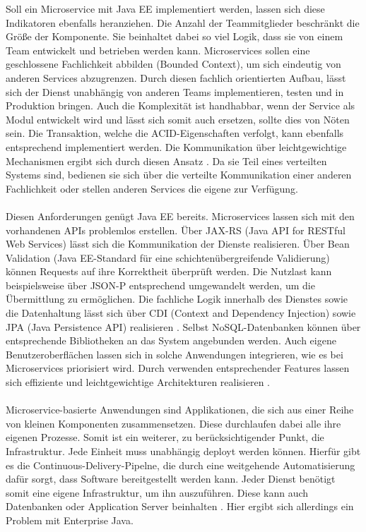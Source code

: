 Soll ein Microservice mit Java EE implementiert werden, lassen sich diese Indikatoren ebenfalls heranziehen. Die Anzahl der Teammitglieder beschränkt die Größe der Komponente. Sie beinhaltet dabei so viel Logik, dass sie von einem Team entwickelt und betrieben werden kann. Microservices sollen eine geschlossene Fachlichkeit abbilden (Bounded Context), um sich eindeutig von anderen Services abzugrenzen. Durch diesen fachlich orientierten Aufbau, lässt sich der Dienst unabhängig von anderen Teams implementieren, testen und in Produktion bringen. Auch die Komplexität ist handhabbar, wenn der Service als Modul entwickelt wird und lässt sich somit auch ersetzen, sollte dies von Nöten sein. Die Transaktion, welche die ACID-Eigenschaften verfolgt, kann ebenfalls entsprechend implementiert werden. Die Kommunikation über leichtgewichtige Mechanismen ergibt sich durch diesen Ansatz \cite{EberhardWolff.2015}. Da sie Teil eines verteilten Systems sind, bedienen sie sich über die verteilte Kommunikation einer anderen Fachlichkeit oder stellen anderen Services die eigene zur Verfügung. \\ \\
Diesen Anforderungen genügt Java EE bereits. Microservices lassen sich mit den vorhandenen APIs problemlos erstellen. Über JAX-RS (Java API for RESTful Web Services) lässt sich die Kommunikation der Dienste realisieren. Über Bean Validation (Java EE-Standard für eine schichtenübergreifende Validierung) können Requests auf ihre Korrektheit überprüft werden. Die Nutzlast kann beispielsweise über JSON-P entsprechend umgewandelt werden, um die Übermittlung zu ermöglichen. Die fachliche Logik innerhalb des Dienstes sowie die Datenhaltung lässt sich über CDI (Context and Dependency Injection) sowie JPA (Java Persistence API) realisieren \cite{LarsRowekamp.2017d}. Selbst NoSQL-Datenbanken können über entsprechende Bibliotheken an das System angebunden werden. Auch eigene Benutzeroberflächen lassen sich in solche Anwendungen integrieren, wie es bei Microservices priorisiert wird. Durch verwenden entsprechender Features lassen sich effiziente und leichtgewichtige Architekturen realisieren \cite{jaxcenter.2016}.\\ \\
Microservice-basierte Anwendungen sind Applikationen, die sich aus einer Reihe von kleinen Komponenten zusammensetzen. Diese durchlaufen dabei alle ihre eigenen Prozesse. Somit ist ein weiterer, zu berücksichtigender Punkt, die Infrastruktur. Jede Einheit muss unabhängig deployt werden können. Hierfür gibt es die Continuous-Delivery-Pipelne, die durch eine weitgehende Automatisierung dafür sorgt, dass Software bereitgestellt werden kann. Jeder Dienst benötigt somit eine eigene Infrastruktur, um ihn auszuführen. Diese kann auch Datenbanken oder Application Server beinhalten \cite{EberhardWolff.2015}. Hier ergibt sich allerdings ein Problem mit Enterprise Java.


